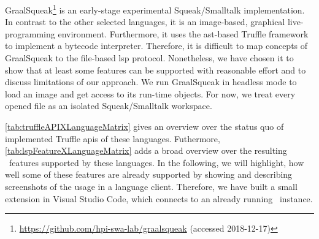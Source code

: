 GraalSqueak\footnote{\url{https://github.com/hpi-swa-lab/graalsqueak} (accessed 2018-12-17)} \cite{niephaus2018graalsqueak} is an early-stage experimental Squeak/Smalltalk \cite{ingalls1997back} implementation. In contrast to the other selected languages, it is an image-based, graphical live-programming environment. Furthermore, it uses the \ac{ast}-based Truffle framework to implement a bytecode interpreter. Therefore, it is difficult to map concepts of GraalSqueak to the file-based \ac{lsp} protocol. Nonetheless, we have chosen it to show that at least some features can be supported with reasonable effort and to discuss limitations of our approach. We run GraalSqueak in headless mode to load an image and get access to its run-time objects. For now, we treat every opened  file as an isolated Squeak/Smalltalk workspace.


\autoref{tab:truffleAPIXLanguageMatrix} gives an overview over the status quo of implemented Truffle \acp{api} of these languages. Futhermore, \autoref{tab:lspFeatureXLanguageMatrix} adds a broad overview over the resulting \graallsp~features supported by these languages. In the following, we will highlight, how well some of these features are already supported by showing and describing screenshots of the usage in a language client. Therefore, we have built a small extension in Visual Studio Code, which connects to an already running \graallsp~instance.

\newcommand{\cmark}{\ding{51}}
\newcommand{\xmark}{\ding{55}}
\newcommand{\nyi}{\xmark}


